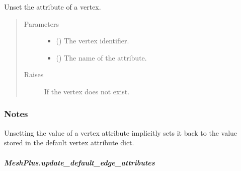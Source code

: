 \documentclass[letterpaper,10pt,english]{sphinxmanual}
\begin{document}
\begin{fulllineitems}
\begin{fulllineitems}
\label{\detokenize{api/generated/directional_clustering.mesh.MeshPlus.unset_vertex_attribute:directional_clustering.mesh.MeshPlus.unset_vertex_attribute}}
Unset the attribute of a vertex.
\begin{quote}\begin{description}
\item[{Parameters}] \leavevmode\begin{itemize}
\item {} 
 () \textendash{} The vertex identifier.

\item {} 
 () \textendash{} The name of the attribute.

\end{itemize}

\item[{Raises}] \leavevmode
{} \textendash{} If the vertex does not exist.

\end{description}\end{quote}
\subsubsection*{Notes}

Unsetting the value of a vertex attribute implicitly sets it back to the value
stored in the default vertex attribute dict.

\end{fulllineitems}



\subparagraph{MeshPlus.update\_default\_edge\_attributes}
\label{\detokenize{api/generated/directional_clustering.mesh.MeshPlus.update_default_edge_attributes:meshplus-update-default-edge-attributes}}\label{\detokenize{api/generated/directional_clustering.mesh.MeshPlus.update_default_edge_attributes::doc}}


\end{fulllineitems}
\end{document}
